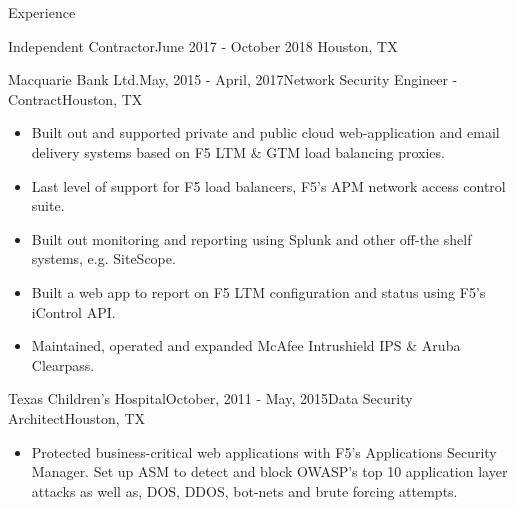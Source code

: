 \documentclass{resume} %
\begin{document}
\begin{rSection}{Experience}
\begin{rSubsection}{Independent Contractor}{June 2017 - October 2018 }{}{Houston, TX}
\end{rSubsection}

\begin{rSubsection}{Macquarie Bank Ltd.}{May, 2015 - April, 2017}{Network Security Engineer - Contract}{Houston, TX}
  \begin{itemize}
        \item Built out and supported private and public cloud web-application and email delivery systems based on F5 LTM & GTM load balancing proxies.
        \item Last level of support for F5 load balancers, F5's APM network access control suite.
        \item Built out monitoring and reporting using Splunk and other off-the shelf systems, e.g. SiteScope.
        \item Built a web app to report on F5 LTM configuration and status using F5's iControl API.
        \item Maintained, operated and expanded McAfee Intrushield IPS \& Aruba Clearpass.
  \end{itemize}

\end{rSubsection}

\begin{rSubsection}{Texas Children's Hospital}{October, 2011 - May, 2015}{Data Security Architect}{Houston, TX}
  \begin{itemize}
         \item Protected business-critical web applications with F5's Applications Security Manager. Set up ASM to detect and block OWASP's top 10 application layer attacks as well as, DOS, DDOS, bot-nets and brute forcing  attempts.


\end{itemize}
\end{rSubsection}
\end{rSection}
\end{document}
